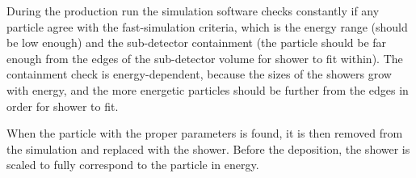 During the production run the simulation software checks constantly if any particle agree with the fast-simulation criteria, which is the energy range (should be low enough) and the sub-detector containment (the particle should be far enough from the edges of the sub-detector volume for shower to fit within). The containment check is energy-dependent, because the sizes of the showers grow with energy, and the more energetic particles should be further from the edges in order for shower to fit.

When the particle with the proper parameters is found, it is then removed from the simulation and replaced with the shower. Before the deposition, the shower is scaled to fully correspond to the particle in energy.

\begin{figure}
\end{figure}

\begin{figure}
\end{figure}

